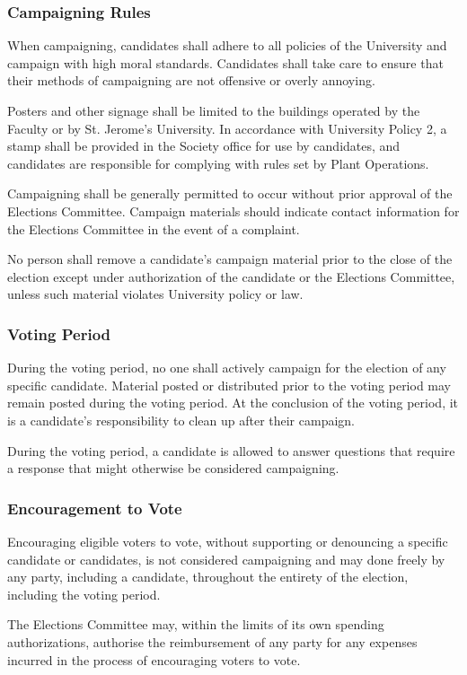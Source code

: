 \subsubsection{Campaigning Rules}
When campaigning, candidates shall adhere to all policies of the University and
campaign with high moral standards. Candidates shall take care to ensure that
their methods of campaigning are not offensive or overly annoying.

Posters and other signage shall be limited to the buildings operated by the
Faculty or by St. Jerome's University. In accordance with University Policy 2,
a stamp shall be provided in the Society office for use by candidates, and
candidates are responsible for complying with rules set by Plant Operations.

Campaigning shall be generally permitted to occur without prior approval of the
Elections Committee. Campaign materials should indicate contact information for
the Elections Committee in the event of a complaint.

No person shall remove a candidate's campaign material prior to the close of the
election except under authorization of the candidate or the Elections Committee,
unless such material violates University policy or law.

\subsubsection{Voting Period}
During the voting period, no one shall actively campaign for the election of any
specific candidate. Material posted or distributed prior to the voting period
may remain posted during the voting period. At the conclusion of the voting
period, it is a candidate's responsibility to clean up after their campaign.

During the voting period, a candidate is allowed to answer questions that
require a response that might otherwise be considered campaigning.

\subsubsection{Encouragement to Vote}
Encouraging eligible voters to vote, without supporting or denouncing a specific
candidate or candidates, is not considered campaigning and may done freely by
any party, including a candidate, throughout the entirety of the election,
including the voting period.

The Elections Committee may, within the limits of its own spending
authorizations, authorise the reimbursement of any party for any expenses
incurred in the process of encouraging voters to vote.

